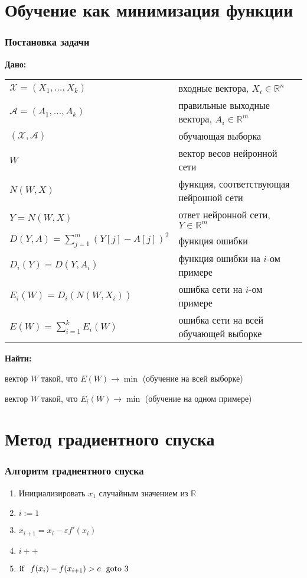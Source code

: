 \documentclass[24pt,pdf,hyperref={unicode},aspectratio=169]{beamer}
\begin{document}
\section{Обучение как минимизация функции}

\begin{frame}\frametitle{Постановка задачи}
{\bf Дано:}
\begin{tabular}{p{6cm} p{7.5cm}}
 $\mathcal{X}=(X_1,\ldots,X_k)$ & входные вектора, $X_i\in\mathbb{R}^n$\\[0.1cm]
 $\mathcal{A}=(A_1,\ldots,A_k)$ & правильные выходные вектора, $A_i\in\mathbb{R}^m$\\[0.1cm]
 $(\mathcal{X},\mathcal{A})$ & обучающая выборка  \\[0.1cm]
 $W$ & вектор весов нейронной сети \\[0.1cm]
 $N(W,X)$ & функция, соответствующая нейронной сети \\[0.1cm]
 $Y=N(W,X)$ & ответ нейронной сети, $Y\in\mathbb{R}^m$ \\[0.1cm]
 $D(Y,A) =\sum_{j=1}^{m} (Y[j]-A[j])^2$ & функция ошибки\\[0.1cm]
 $D_i(Y)=D(Y,A_i) $ & функция ошибки на $i$-ом примере \\[0.1cm]
  $E_i(W)=D_i(N(W,X_i))$ & ошибка сети на $i$-ом примере\\[0.1cm]
  $E(W)=\sum_{i=1}^{k}E_i(W) $ & ошибка сети на всей обучающей выборке \\[0.1cm]      
 \end{tabular}
{\bf Найти:}

вектор $W$ такой, что $E(W) \rightarrow \min$ (обучение на всей выборке)

вектор $W$ такой, что $E_i(W) \rightarrow \min$ (обучение на одном примере)

\end{frame}


\section{Метод градиентного спуска}

\begin{frame}\frametitle{Алгоритм градиентного спуска}
\begin{enumerate}
 \item Инициализировать $x_1$ случайным значением из $\mathbb{R}$
 \item $i:=1$
 \item $x_{i+1}=x_i-\varepsilon f'(x_i)$
 \item $i++$
 \item ${\rm if}\ \ f(x_{i})-f(x_{i+1}) >c\ \ {\rm goto}\ 3$
\end{enumerate}
\end{frame}
\end{document}
